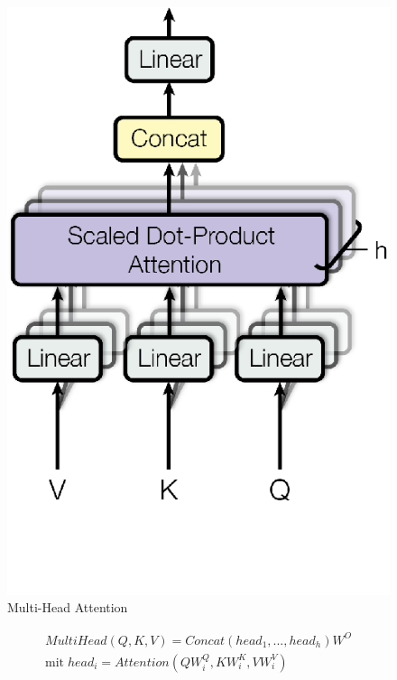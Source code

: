 \documentclass[conference]{IEEEtran}
\begin{document}
\begin{figure}[htbp]
\centerline{\includegraphics{img/multi_head_attention.png}}
\caption{Multi-Head Attention \cite{attention_is_all_you_need}}
\label{fig}
\end{figure}

\begin{eqnarray}
    MultiHead(Q,K,V) = Concat(head_1,...,head_h)W^O \\
    \text{mit} \; head_i = Attention(QW_i^Q , KW_i^K , VW_i^V)
\end{eqnarray}
\end{document}
